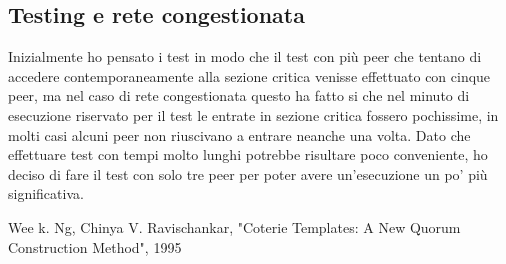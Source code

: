 \documentclass[conference]{IEEEtran}
\begin{document}
\subsection*{Testing e rete congestionata}

Inizialmente ho pensato i test in modo che il test con più peer che tentano di accedere contemporaneamente alla sezione critica venisse effettuato con cinque peer, ma nel caso di rete congestionata questo ha fatto si che nel minuto di esecuzione riservato per il test le entrate in sezione critica fossero pochissime, in molti casi alcuni peer non riuscivano a entrare neanche una volta. Dato che effettuare test con tempi molto lunghi potrebbe risultare poco conveniente, ho deciso di fare il test con solo tre peer per poter avere un'esecuzione un po' più significativa.



\begin{thebibliography}{00}
 Wee k. Ng,  Chinya V. Ravischankar, "Coterie Templates: A New Quorum Construction Method", 1995
\end{thebibliography}
\end{document}
